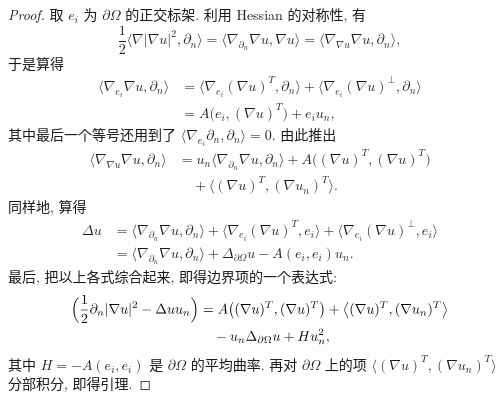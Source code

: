 \begin{proof}
取 $e_i$ 为 $\partial\Omega$ 的正交标架. 利用 Hessian 的对称性, 有
\begin{equation}
\frac12\bigl\langle\nabla|\nabla u|^2,\partial_n\bigr\rangle
=\bigl\langle\nabla_{\partial_n}\nabla u,\nabla u\bigr\rangle
=\bigl\langle\nabla_{\nabla u}\nabla u,\partial_n\bigr\rangle,
\label{eq:7.55}
\end{equation}
于是算得
\begin{equation}
\begin{aligned}
\langle\nabla_{e_i}\nabla u,\partial_n\rangle
&=\bigl\langle\nabla_{e_i}(\nabla u)^T,\partial_n\bigr\rangle
+\bigl\langle\nabla_{e_i}(\nabla u)^\perp,\partial_n\bigr\rangle\\
&=A\bigl(e_i,(\nabla u)^T\bigr)+e_iu_n,
\end{aligned}
\label{eq:7.56}
\end{equation}
其中最后一个等号还用到了
$\langle\nabla_{e_i}\partial_n,\partial_n\rangle=0$. 由此推出
\begin{equation}
\begin{aligned}
\bigl\langle\nabla_{\nabla u}\nabla u,\partial_n\bigr\rangle
&=u_n\bigl\langle\nabla_{\partial_n}\nabla u,\partial_n\bigr\rangle
+A\bigl((\nabla u)^T,(\nabla u)^T\bigr)\\
&\quad+\bigl\langle(\nabla u)^T,(\nabla u_n)^T\bigr\rangle.
\end{aligned}
\label{eq:7.57}
\end{equation}
同样地, 算得
\begin{equation}
\begin{aligned}
\Delta u&=\bigl\langle\nabla_{\partial_n}\nabla u,\partial_n\bigr\rangle
+\bigl\langle\nabla_{e_i}(\nabla u)^T,e_i\bigr\rangle
+\bigl\langle\nabla_{e_i}(\nabla u)^\perp,e_i\bigr\rangle\\
&=\bigl\langle\nabla_{\partial_n}\nabla u,\partial_n\bigr\rangle
+\Delta_{\partial\Omega}u-A(e_i,e_i)u_n.
\end{aligned}
\label{eq:7.58}
\end{equation}
最后, 把以上各式综合起来, 即得边界项的一个表达式:
\begin{equation}
\begin{aligned}
\Bigl(\frac12\partial_n|\nabla u|^2-\Delta uu_n\Bigr)
&=A\bigl((\nabla u)^T,(\nabla u)^T\bigr)
+\bigl\langle(\nabla u)^T,(\nabla u_n)^T\bigr\rangle\\
&\quad-u_n\Delta_{\partial\Omega}u+Hu_n^2,
\end{aligned}
\label{eq:7.59}
\end{equation}
其中 $H=-A(e_i,e_i)$ 是 $\partial\Omega$ 的平均曲率. 再对 $\partial\Omega$
上的项 $\langle(\nabla u)^T,(\nabla u_n)^T\rangle$ 分部积分, 即得引理.
\end{proof}

